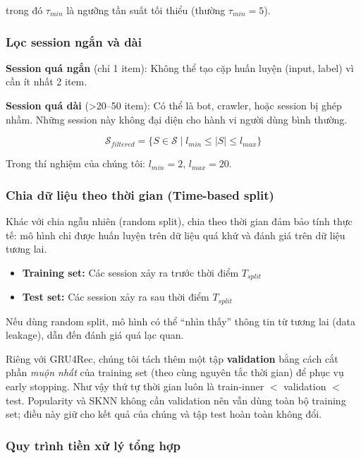 \documentclass[12pt, a4paper]{article}
\begin{document}
trong đó $\tau_{min}$ là ngưỡng tần suất tối thiểu (thường $\tau_{min} = 5$).

\subsubsection{Lọc session ngắn và dài}

\textbf{Session quá ngắn} (chỉ 1 item): Không thể tạo cặp huấn luyện (input, label) vì cần ít nhất 2 item.

\textbf{Session quá dài} (>20--50 item): Có thể là bot, crawler, hoặc session bị ghép nhầm. Những session này không đại diện cho hành vi người dùng bình thường.

\begin{equation}
    \mathcal{S}_{filtered} = \{S \in \mathcal{S} \;|\; l_{min} \leq |S| \leq l_{max}\}
    \label{eq:filter_session}
\end{equation}

Trong thí nghiệm của chúng tôi: $l_{min} = 2$, $l_{max} = 20$.

\subsubsection{Chia dữ liệu theo thời gian (Time-based split)}

Khác với chia ngẫu nhiên (random split), chia theo thời gian đảm bảo tính thực tế: mô hình chỉ được huấn luyện trên dữ liệu quá khứ và đánh giá trên dữ liệu tương lai.

\begin{itemize}
    \item \textbf{Training set:} Các session xảy ra trước thời điểm $T_{split}$
    \item \textbf{Test set:} Các session xảy ra sau thời điểm $T_{split}$
\end{itemize}

Nếu dùng random split, mô hình có thể ``nhìn thấy'' thông tin từ tương lai (data leakage), dẫn đến đánh giá quá lạc quan.

Riêng với GRU4Rec, chúng tôi tách thêm một tập \textbf{validation} bằng cách cắt phần \emph{muộn nhất} của training set (theo cùng nguyên tắc thời gian) để phục vụ early stopping. Như vậy thứ tự thời gian luôn là train-inner $<$ validation $<$ test. Popularity và SKNN không cần validation nên vẫn dùng toàn bộ training set; điều này giữ cho kết quả của chúng và tập test hoàn toàn không đổi.

\subsubsection{Quy trình tiền xử lý tổng hợp}
\end{document}
